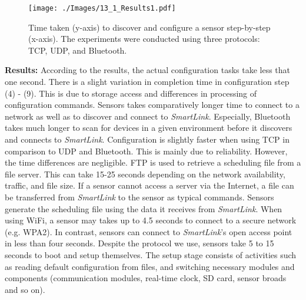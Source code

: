 \documentclass[graybox]{svmult}
\begin{document}
\begin{figure}[t]
 \centering
\texttt{[image: ./Images/13\_1\_Results1.pdf]}
\caption{Time taken (y-axis) to discover and configure a sensor step-by-step (x-axis). The experiments were conducted using three  protocols: TCP, UDP, and Bluetooth. }
 \label{Figure:Results1}
\end{figure}





\textbf{Results:} According to the results, the actual configuration tasks take less that one second. There is a slight variation in completion time in  configuration  step (4) - (9). This is  due to storage access and differences in processing of configuration commands. Sensors takes comparatively longer time to connect to a network as well as to discover and connect to \textit{SmartLink}. Especially, Bluetooth takes much longer to scan for devices in a given environment before it discovers and connects to \textit{SmartLink}. Configuration is slightly faster when using  TCP in comparison to UDP and Bluetooth. This is mainly due to reliability. However, the time differences are negligible. FTP is used to retrieve a scheduling file from a file server. This can take 15-25 seconds depending on the network availability, traffic, and file size. If a sensor cannot access a server via the Internet, a file can be transferred from \textit{SmartLink} to the sensor as typical commands. Sensors generate the scheduling file using the data it receives from \textit{SmartLink}. When using WiFi, a sensor may takes up to 4.5 seconds to connect to a secure network (e.g. WPA2). In contrast, sensors can connect to \textit{SmartLink}'s open access point in less than four seconds.  Despite the protocol we use, sensors take 5 to 15 seconds to boot and setup themselves. The setup stage consists of activities such as reading default configuration from files, and  switching necessary modules and components (communication modules, real-time clock, SD card, sensor broads and so on).
\end{document}
